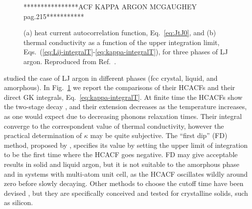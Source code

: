 \begin{figure}
    \begin{center}
    ****************ACF KAPPA ARGON MCGAUGHEY pag.215***********
    \end{center}
	\caption{(a) heat current autocorrelation function, Eq.~\eqref{eq:JtJ0}, and
    (b) thermal conductivity as a function of the upper integration limit, Eqs.~(\ref{eq:Lij-integralT}-\ref{eq:kappa-integralT}), for three phases of LJ argon. Reproduced from Ref.~\cite{McGaughey2004a}.} \label{fig:argon-gk-phases-examples}
\end{figure}
\citeauthor{McGaughey2006} \cite{McGaughey2006,McGaughey2004a,McGaughey2004b} studied the case of LJ argon in different phases (fcc crystal, liquid, and amorphous). In Fig.~\ref{fig:argon-gk-phases-examples} we report the comparisons of their HCACFs and their direct GK integrals, Eq.~\eqref{eq:kappa-integralT}. At finite time the HCACFs show the two-stage decay \cite{Ladd1986}, and their extension decreases as the temperature increases, as one would expect due to decreasing phonons relaxation times. Their integral converge to the correspondent value of thermal conductivity, however the practical determination of $\kappa$ may be quite subjective. The ``first dip'' (FD) method, proposed by \citet{Li1998}, specifies its value by setting the upper limit of integration to be the first time where the HCACF goes negative. FD may give acceptable results in solid and liquid argon, but it is not suitable to the amorphous phase and in systems with multi-atom unit cell, as the HCACF oscillates wildly around zero before slowly decaying. Other methods to choose the cutoff time have been devised \cite{Chen2010}, but they are specifically conceived and tested for crystalline solids, such as silicon.



